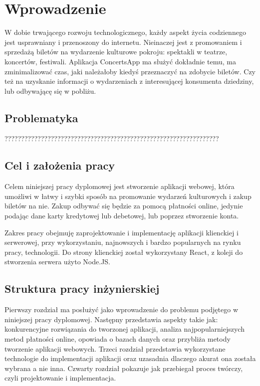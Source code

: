\documentclass[12pt]{article}
\begin{document}
\begin{sloppypar}


\tableofcontents
\newpage

\section{Wprowadzenie}
{
  W dobie trwającego rozwoju technologicznego, każdy aspekt życia codziennego jest usprawniany i przenoszony
  do internetu. Nieinaczej jest z promowaniem i sprzedażą biletów na wydarzenie kulturowe pokroju:
  spektakli w teatrze, koncertów, festiwali. Aplikacja ConcertsApp ma służyć dokładnie temu,
  ma zminimalizować czas, jaki należałoby kiedyś przeznaczyć na zdobycie biletów. Czy też na uzyskanie
  informacji o wydarzeniach z interesującej konsumenta dziedziny, lub odbywającę się w pobliżu.
  \subsection{Problematyka}
  {
    ?????????????????????????????????????????????????????????????????
  }
  \subsection{Cel i założenia pracy}
  {
    Celem niniejszej pracy dyplomowej jest stworzenie aplikacji webowej, która umożliwi w łatwy i szybki
    sposób na promowanie wydarzeń kulturowych i zakup biletów na nie. Zakup odbywać się będzie za pomocą
    płatności online, jedynie podając dane karty kredytowej lub debetowej, lub poprzez stworzenie konta.\par
    Zakres pracy obejmuję zaprojektowanie i implementację aplikacji klienckiej i serwerowej, przy
    wykorzystaniu, najnowszych i bardzo popularnych na rynku pracy, technologii. Do strony klienckiej
    został wykorzystany React, z koleji do stworzenia serwera użyto Node.JS.
  }
  \subsection{Struktura pracy inżynierskiej}
  {
    Pierwszy rozdział ma posłużyć jako wprowadzenie do problemu podjętego w niniejszej pracy dyplomowej.
    Następny przedstawia aspekty takie jak: konkurencyjne rozwiązania do tworzonej aplikacji,
    analiza najpopularniejszych metod płatności online, opowiada o bazach danych oraz przybliża
    metody tworzenie aplikacji webowych.
    Trzeci rozdział przedstawia wykorzystane technologie do implementacji aplikacji oraz uzasadnia dlaczego
    akurat ona została wybrana a nie inna.
    Czwarty rozdział pokazuje jak przebiegał proces twórczy, czyli projektowanie i implementacja.
  }
}


\end{sloppypar}
\end{document}
